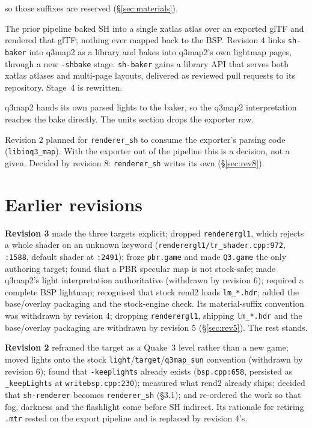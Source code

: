 \documentclass[11pt,a4paper]{article}
\begin{document}
\begin{description}[style=nextline]
  so those suffixes are reserved (§\ref{sec:materials}).
\item[SH baking moves into q3map2.]
  The prior pipeline baked SH into a single xatlas atlas over an exported glTF and rendered that
  glTF; nothing ever mapped back to the BSP. Revision 4 links \texttt{sh-baker} into q3map2 as a
  library and bakes into q3map2's own lightmap pages, through a new \texttt{-shbake} stage.
  \texttt{sh-baker} gains a library API that serves both xatlas atlases and multi-page layouts,
  delivered as reviewed pull requests to its repository. Stage~4 is rewritten.
\item[The exporter's light conversion leaves the chain.]
  q3map2 hands its own parsed lights to the baker, so the q3map2 interpretation reaches the bake
  directly. The units section drops the exporter row.
\item[Open: parser reuse for \texttt{renderer\_sh}.]
  Revision 2 planned for \texttt{renderer\_sh} to consume the exporter's parsing code
  (\texttt{libioq3\_map}). With the exporter out of the pipeline this is a decision, not a given.
  Decided by revision 8: \texttt{renderer\_sh} writes its own (§\ref{sec:rev8}).
\end{description}

\section{Earlier revisions}

\textbf{Revision 3} made the three targets explicit; dropped \texttt{renderergl1}, which rejects a
whole shader on an unknown keyword (\texttt{renderergl1/tr\_shader.cpp:972}, \texttt{:1588},
default shader at \texttt{:2491}); froze \texttt{pbr.game} and made \texttt{Q3.game} the only
authoring target; found that a PBR specular map is not stock-safe; made q3map2's light
interpretation authoritative (withdrawn by revision 6); required a complete BSP lightmap; recognised that stock rend2 loads
\texttt{lm\_*.hdr}; added the base/overlay packaging and the stock-engine check. Its
material-suffix convention was withdrawn by revision 4; dropping \texttt{renderergl1}, shipping
\texttt{lm\_*.hdr} and the base/overlay packaging are withdrawn by revision 5
(§\ref{sec:rev5}). The rest stands.

\textbf{Revision 2} reframed the target as a Quake~3 level rather than a new game; moved lights onto
the stock \texttt{light}/\texttt{target}/\texttt{q3map\_sun} convention (withdrawn by revision 6);
found that
\texttt{-keeplights} already exists (\texttt{bsp.cpp:658}, persisted as \texttt{\_keepLights} at
\texttt{writebsp.cpp:230}); measured what rend2 already ships; decided that \texttt{sh-renderer}
becomes \texttt{renderer\_sh} (§3.1); and re-ordered the work so that fog, darkness and the
flashlight come before SH indirect. Its rationale for retiring \texttt{.mtr} rested on the export
pipeline and is replaced by revision 4's.
\end{document}
